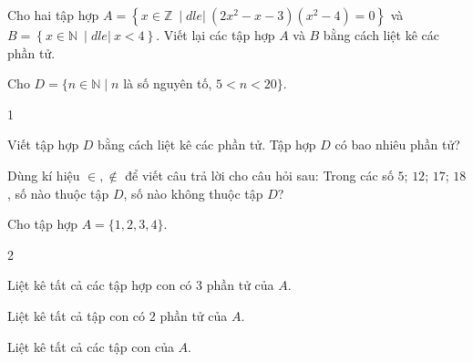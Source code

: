 \begin{bt}%
	Cho hai  tập hợp $A=\left\{ x \in \mathbb{Z} \ \mid dle | \ (2x^2-x-3)(x^2-4) = 0 \right\}$ và $B=\left\{ x \in \mathbb{N} \ \mid dle | \ x<4 \right\}$. Viết lại các tập hợp $A$ và $B$ bằng cách liệt kê các phần tử.
\end{bt}

\begin{bt}%
	Cho $D=\{n  \in \mathbb{N} \mid n$ là số nguyên tố, $5<n<20\}$.
	\begin{enumEX}{1}
		\item Viết tập hợp $D$ bằng cách liệt  kê các phần tử. Tập hợp $D$ có bao nhiêu phần tử?
		\item  Dùng kí hiệu $\in, \notin$ để viết câu trả lời cho câu hỏi sau: Trong các số $5$; $12$; $17$; $18$, số nào thuộc tập $D$, số nào không thuộc tập $D$?
	\end{enumEX}
\end{bt}

\begin{bt}%
	Cho tập hợp $ A=\{1,2,3,4\}  $.
	\begin{enumEX}{2}
		\item Liệt kê tất cả các  tập hợp con có $ 3 $ phần tử của $ A $.
		\item Liệt kê tất cả tập con có $ 2 $ phần tử  của $ A $.
		\item Liệt kê tất  cả các tập con của $ A $.
	\end{enumEX}
\end{bt}

